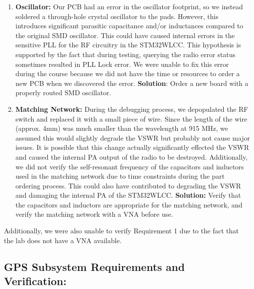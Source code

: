 \documentclass{article}
\begin{document}
\begin{enumerate}
	\item \textbf{Oscillator:} Our PCB had an error in the oscillator footprint, so we instead soldered a through-hole crystal oscillator to the pads. However, this introduces significant parasitic capacitance and/or inductances compared to the original SMD oscillator. This could have caused internal errors in the sensitive PLL for the RF circuitry in the STM32WLCC. This hypothesis is supported by the fact that during testing, querying the radio error status sometimes resulted in PLL Lock error. We were unable to fix this error during the course because we did not have the time or resources to order a new PCB when we discovered the error. \textbf{Solution}: Order a new board with a properly routed SMD oscillator. 
	\item \textbf{Matching Network:} During the debugging process, we depopulated the RF switch and replaced it with a small piece of wire. Since the length of the wire (approx. 4mm) was much smaller than the wavelength at 915 MHz, we assumed this would slightly degrade the VSWR but probably not cause major issues. It is possible that this change actually significantly effected the VSWR and caused the internal PA output of the radio to be destroyed. Additionally, we did not verify the self-resonant frequency of the capacitors and inductors used in the matching network due to time constraints during the part ordering process. This could also have contributed to degrading the VSWR and damaging the internal PA of the STM32WLCC. \textbf{Solution:} Verify that the capacitors and inductors are appropriate for the matching network, and verify the matching network with a VNA before use. 
\end{enumerate}

Additionally, we were also unable to verify Requirement 1 due to the fact that the lab does not have a VNA available. 


\subsection{GPS Subsystem Requirements and Verification:}
\end{document}
